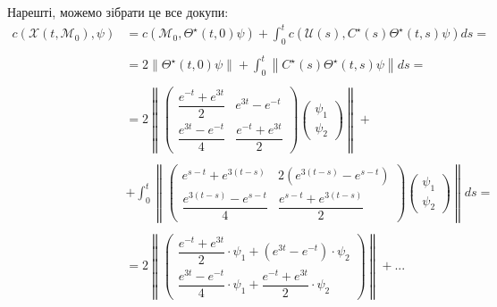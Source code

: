 \begin{solution}
    Нарешті, можемо зібрати це все докупи: 
    \begin{align*}
        c(\mathcal{X}(t, \mathcal{M}_0), \psi) &= c(\mathcal{M}_0, \Theta^\star(t, 0) \psi) + \int_{0}^t c(\mathcal{U}(s), C^\star(s) \Theta^\star(t, s)\psi) ds = \\
        \\
        &= 2 \|\Theta^\star(t, 0) \psi\| + \int_{0}^t \left\|C^\star(s) \Theta^\star(t, s)\psi\right\| ds = \\
        \\
        &= 2 \left\|\begin{pmatrix} \dfrac{e^{-t} + e^{3t}}{2} & e^{3t} - e^{-t} \\ \dfrac{e^{3t} - e^{-t}}{4} & \dfrac{e^{-t} + e^{3t}}{2} \end{pmatrix} \begin{pmatrix} \psi_1 \\ \psi_2 \end{pmatrix}\right\| + \\
        \\
        &+ \int_{0}^t \left\|\begin{pmatrix} e^{s-t} + e^{3(t-s)} & 2(e^{3(t-s)} - e^{s-t}) \\ \dfrac{e^{3(t-s)} - e^{s-t}}{4} & \dfrac{e^{s-t} + e^{3(t-s)}}{2} \end{pmatrix} \begin{pmatrix} \psi_1 \\ \psi_2 \end{pmatrix}\right\| ds = \\
        \\
        &= 2 \left\| \begin{pmatrix} \dfrac{e^{-t} + e^{3t}}{2} \cdot \psi_1 + (e^{3t} - e^{-t}) \cdot \psi_2 \\ \dfrac{e^{3t} - e^{-t}}{4}\cdot\psi_1 + \dfrac{e^{-t} + e^{3t}}{2}\cdot\psi_2 \end{pmatrix} \right\| + ...
    \end{align*}
\end{solution} 